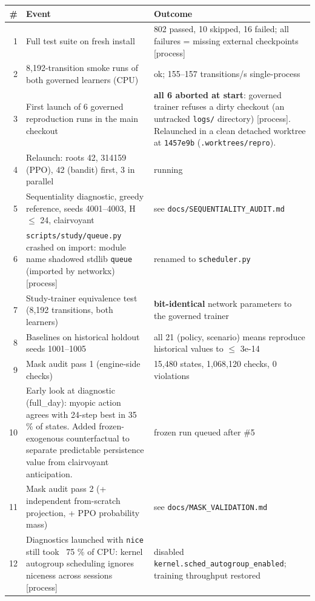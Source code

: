 {\small\begin{longtable}{@{}rp{}p{}@{}}\toprule
\# & Event & Outcome \\\midrule
1 & Full test suite on fresh install & 802 passed, 10 skipped, 16 failed; all failures = missing external checkpoints [process] \\
2 & 8,192-transition smoke runs of both governed learners (CPU) & ok; 155--157 transitions/s single-process \\
3 & First launch of 6 governed reproduction runs in the main checkout & \textbf{all 6 aborted at start}: governed trainer refuses a dirty checkout (an untracked \texttt{logs/\allowbreak{}} directory) [process]. Relaunched in a clean detached worktree at \texttt{1457e9b} (\texttt{.\allowbreak{}worktrees/\allowbreak{}repro}). \\
4 & Relaunch: roots 42, 314159 (PPO), 42 (bandit) first, 3 in parallel & running \\
5 & Sequentiality diagnostic, greedy reference, seeds 4001--4003, H $\le$ 24, clairvoyant & see \texttt{docs/\allowbreak{}SEQUENTIALITY\_\allowbreak{}AUDIT.\allowbreak{}md} \\
6 & \texttt{scripts/\allowbreak{}study/\allowbreak{}queue.\allowbreak{}py} crashed on import: module name shadowed stdlib \texttt{queue} (imported by networkx) [process] & renamed to \texttt{scheduler.\allowbreak{}py} \\
7 & Study-trainer equivalence test (8,192 transitions, both learners) & \textbf{bit-identical} network parameters to the governed trainer \\
8 & Baselines on historical holdout seeds 1001--1005 & all 21 (policy, scenario) means reproduce historical values to $\le$ 3e-14 \\
9 & Mask audit pass 1 (engine-side checks) & 15,480 states, 1,068,120 checks, 0 violations \\
10 & Early look at diagnostic (full\_day): myopic action agrees with 24-step best in 35 \% of states. Added frozen-exogenous counterfactual to separate predictable persistence value from clairvoyant anticipation. & frozen run queued after \#5 \\
11 & Mask audit pass 2 (+ independent from-scratch projection, + PPO probability mass) & see \texttt{docs/\allowbreak{}MASK\_\allowbreak{}VALIDATION.\allowbreak{}md} \\
12 & Diagnostics launched with \texttt{nice} still took ~75 \% of CPU: kernel autogroup scheduling ignores niceness across sessions [process] & disabled \texttt{kernel.\allowbreak{}sched\_\allowbreak{}autogroup\_\allowbreak{}enabled}; training throughput restored \\

\end{longtable}}
